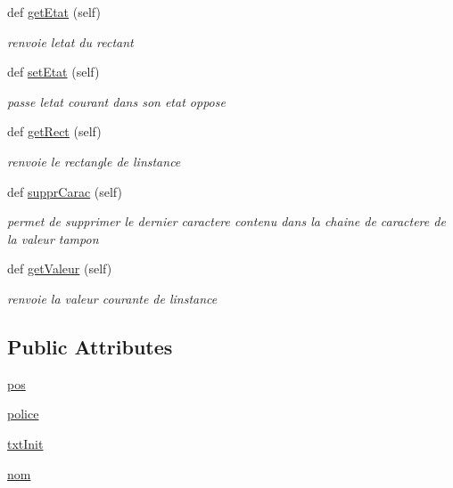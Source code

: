 \begin{DoxyCompactItemize}
def \hyperlink{classaffichage_1_1rect_modifier_variables_a8d4bd75d18102f0b3c93da2f40cc3c48}{get\+Etat} (self)
\begin{DoxyCompactList}\small\item\em renvoie l\textquotesingle{}etat du rectant \end{DoxyCompactList}\item 
def \hyperlink{classaffichage_1_1rect_modifier_variables_ac911462911dcfaf7f42ade3202b71d46}{set\+Etat} (self)
\begin{DoxyCompactList}\small\item\em passe l\textquotesingle{}etat courant dans son etat oppose \end{DoxyCompactList}\item 
def \hyperlink{classaffichage_1_1rect_modifier_variables_a475182511e9c8824f4086dc4b7c8468c}{get\+Rect} (self)
\begin{DoxyCompactList}\small\item\em renvoie le rectangle de l\textquotesingle{}instance \end{DoxyCompactList}\item 
def \hyperlink{classaffichage_1_1rect_modifier_variables_add25dd453e03aee3377fa7d294704d24}{suppr\+Carac} (self)
\begin{DoxyCompactList}\small\item\em permet de supprimer le dernier caractere contenu dans la chaine de caractere de la valeur tampon \end{DoxyCompactList}\item 
def \hyperlink{classaffichage_1_1rect_modifier_variables_a48e2b04c5ff8819ed709eb32f6708d80}{get\+Valeur} (self)
\begin{DoxyCompactList}\small\item\em renvoie la valeur courante de l\textquotesingle{}instance \end{DoxyCompactList}\end{DoxyCompactItemize}
\subsection*{Public Attributes}
\begin{DoxyCompactItemize}
\item 
\hyperlink{classaffichage_1_1rect_modifier_variables_a35d142e0546decd4b8a60133a8d8687f}{pos}
\item 
\hyperlink{classaffichage_1_1rect_modifier_variables_a1d316c60225d933527e6e94ce5c87515}{police}
\item 
\hyperlink{classaffichage_1_1rect_modifier_variables_abf231c24af86a4b80c5ccb79d441189b}{txt\+Init}
\item 
\hyperlink{classaffichage_1_1rect_modifier_variables_a114612fb3a86a4b8c311170e37146b31}{nom}
\end{DoxyCompactItemize}



